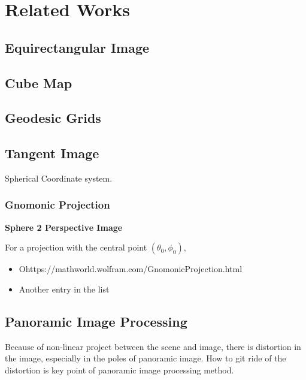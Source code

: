 
\section{Related Works}


\subsection{Equirectangular Image}


\subsection{Cube Map}


\subsection{Geodesic Grids}



\subsection{Tangent Image}


Spherical Coordinate system.



\subsubsection{Gnomonic Projection}

\textbf{Sphere 2 Perspective Image}


For a projection with the central point $(\theta_0, \phi_0)$,



\begin{itemize}
	\item Ohttps://mathworld.wolfram.com/GnomonicProjection.html
	\item Another entry in the list
\end{itemize}



\subsection{Panoramic Image Processing}

Because of non-linear project between the scene and image, there is distortion in the image, especially in the poles of panoramic image.
How to git ride of the distortion is key point of panoramic image processing method. 

